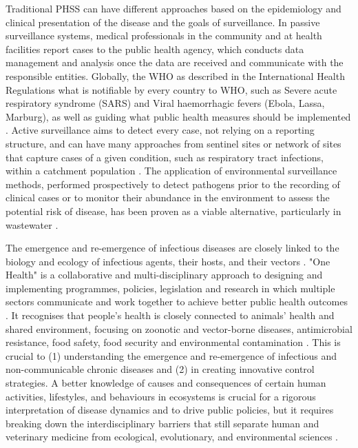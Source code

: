 Traditional PHSS can have different approaches based on the epidemiology and clinical presentation of the disease and the goals of surveillance. 
In passive surveillance systems, medical professionals in the community and at health facilities report cases to the public health agency, which conducts data management and analysis once the data are received and communicate with the responsible entities. 
Globally, the WHO as described in the International Health Regulations what is notifiable by every country to WHO, such as Severe acute respiratory syndrome (SARS) and Viral haemorrhagic fevers (Ebola, Lassa, Marburg), as well as guiding what public health measures should be implemented \citep{world_health_organization_international_2005}. 
Active surveillance aims to detect every case, not relying on a reporting structure, and can have many approaches from sentinel sites or network of sites that capture cases of a given condition, such as respiratory tract infections, within a catchment population \citep{murray_infectious_2017, melo-cristino_estudo_2006}. 
The application of environmental surveillance methods, performed prospectively to detect pathogens prior to the recording of clinical cases or to monitor their abundance in the environment to assess the potential risk of disease, has been proven as a viable alternative, particularly in wastewater \citep{andrews_environmental_2020, mcweeney_demonstration_1894, baker_combined_2011, larsen_tracking_2020}.  

The emergence and re-emergence of infectious diseases are closely linked to the biology and ecology of infectious agents, their hosts, and their vectors \citep{destoumieux-garzon_one_2018}.
"One Health" is a collaborative and multi-disciplinary approach to designing and implementing programmes, policies, legislation and research in which multiple sectors communicate and work together to achieve better public health outcomes \citep{mackenzie_one_2019}. 
It recognises that people’s health is closely connected to animals’ health and shared environment, focusing on zoonotic and vector-borne diseases, antimicrobial resistance, food safety, food security and environmental contamination \citep{rugarabamu_one-health_2021}.
This is crucial to (1) understanding the emergence and re-emergence of infectious and non-communicable chronic diseases and (2) in creating innovative control strategies.
A better knowledge of causes and consequences of certain human activities, lifestyles, and behaviours in ecosystems is crucial for a rigorous interpretation of disease dynamics and to drive public policies, but it requires breaking down the interdisciplinary barriers that still separate human and veterinary medicine from ecological, evolutionary, and environmental sciences \citep{destoumieux-garzon_one_2018}. 

